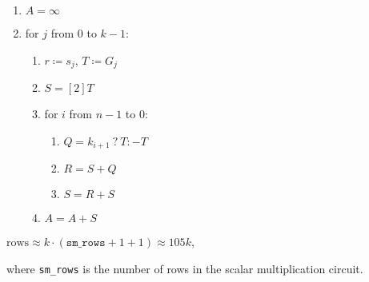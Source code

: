 \begin{enumerate}
    \item $A = \infty$
    \item for $j$ from $0$ to $k-1$:
    \begin{enumerate}
        \item $r \coloneqq s_j$, $T \coloneqq G_j$
        \item $S = [2]T$
        \item for $i$ from $n - 1$ to $0$:
        \begin{enumerate}
            \item $Q = k_{i + 1} \: ? \: T : -T$
            \item $R = S + Q$
            \item $S = R + S$
        \end{enumerate}
        \item $A = A + S$
    \end{enumerate}
\end{enumerate}


\begin{center}
    $\text{rows} \approx k \cdot (\texttt{sm\_rows} + 1 + 1) \approx 105k$,
\end{center}
where \texttt{sm\_rows} is the number of rows in the scalar multiplication circuit.